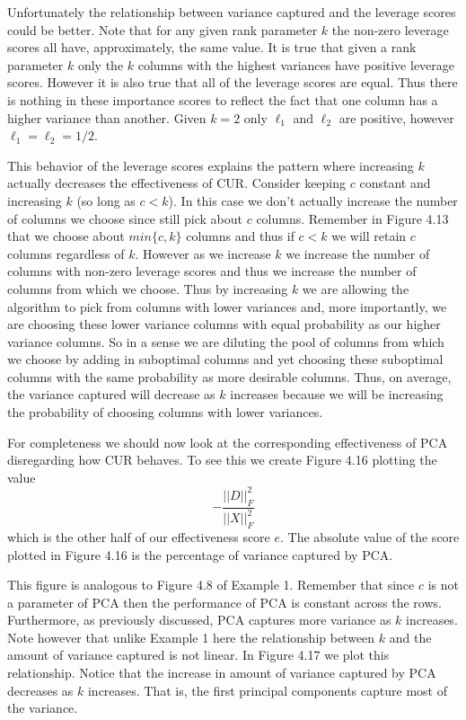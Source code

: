 \documentclass{book}
\begin{document}
Unfortunately the relationship between variance captured and the leverage scores could be better. Note that for any given rank parameter $k$ the non-zero leverage scores all have, approximately, the same value. It is true that given a rank parameter $k$ only the $k$ columns with the highest variances have positive leverage scores. However it is also true that all of the leverage scores are equal. Thus there is nothing in these importance scores to reflect the fact that one column has a higher variance than another. Given $k=2$ only $\ell_1$ and $\ell_2$ are positive, however $\ell_1=\ell_2=1/2$. %

This behavior of the leverage scores explains the pattern where increasing $k$ actually decreases the effectiveness of CUR. Consider keeping $c$ constant and increasing $k$ (so long as $c<k$). In this case we don't actually increase the number of columns we choose since still pick about $c$ columns. Remember in Figure 4.13 that we choose about $min\{c,k\}$ columns and thus if $c<k$ we will retain $c$ columns regardless of $k$. However as we increase $k$ we increase the number of columns with non-zero leverage scores and thus we increase the number of columns from which we choose. Thus by increasing $k$ we are allowing the algorithm to pick from columns with lower variances and, more importantly, we are choosing these lower variance columns with equal probability as our higher variance columns. So in a sense we are diluting the pool of columns from which we choose by adding in suboptimal columns and yet choosing these suboptimal columns with the same probability as more desirable columns. Thus, on average, the variance captured will decrease as $k$ increases because we will be increasing the probability of choosing columns with lower variances. 

For completeness we should now look at the corresponding effectiveness of PCA disregarding how CUR behaves. To see this we create Figure 4.16 plotting the value
$$
-\frac{||D||_F^2}{||X||_F^2}
$$
which is the other half of our effectiveness score $e$. The absolute value of the score plotted in Figure 4.16 is the percentage of variance captured by PCA. 

This figure is analogous to Figure 4.8 of Example 1. Remember that since $c$ is not a parameter of PCA then the performance of PCA is constant across the rows. Furthermore, as previously discussed,  PCA captures more variance as $k$ increases. Note however that unlike Example 1 here the relationship between $k$ and the amount of variance captured is not linear. In Figure 4.17 we plot this relationship. Notice that the increase in amount of variance captured by PCA decreases as $k$ increases. That is, the first principal components capture most of the variance. 
\end{document}
